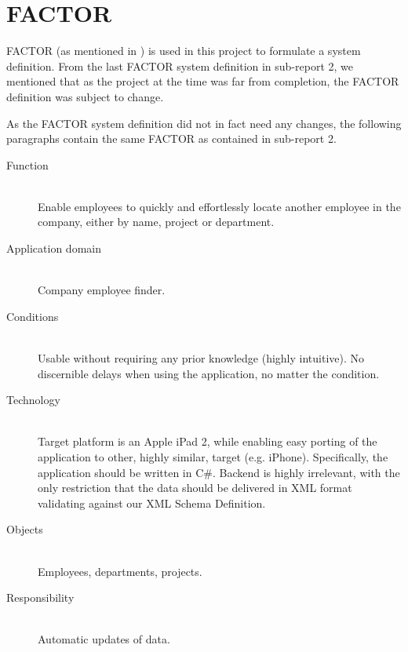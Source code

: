 \section{FACTOR}

FACTOR (as mentioned in \cite{factor}) is used in this project to
formulate a system definition. From the last FACTOR system definition
in sub-report 2, we mentioned that as the project at the time was far
from completion, the FACTOR definition was subject to change.

As the FACTOR system definition did not in fact need any changes, the
following paragraphs contain the same FACTOR as contained in
sub-report 2.

\begin{description}
\item[Function] \hfill \\ Enable employees to quickly and effortlessly
  locate another employee in the company, either by name, project or
  department.
\item[Application domain] \hfill \\ Company employee finder.
\item[Conditions] \hfill \\ Usable without requiring any prior
  knowledge (highly intuitive). No discernible delays when using the
  application, no matter the condition.
\item[Technology] \hfill \\ Target platform is an Apple iPad 2, while
  enabling easy porting of the application to other, highly similar,
  target (e.g. iPhone). Specifically, the application should be
  written in C\#. Backend is highly irrelevant, with the only
  restriction that the data should be delivered in XML format
  validating against our XML Schema Definition.
\item[Objects] \hfill \\ Employees, departments, projects.
\item[Responsibility] \hfill \\ Automatic updates of data.
\end{description}
